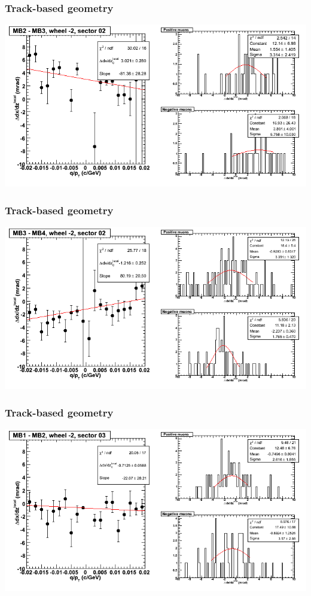 \documentclass[compress]{beamer}
\begin{document}
\begin{frame}
\frametitle{Track-based geometry}
\includegraphics[width=\linewidth]{NOV4_segdiffs/dt13_slope_A_02_23.png}
\end{frame}

\begin{frame}
\frametitle{Track-based geometry}
\includegraphics[width=\linewidth]{NOV4_segdiffs/dt13_slope_A_02_34.png}
\end{frame}

\begin{frame}
\frametitle{Track-based geometry}
\includegraphics[width=\linewidth]{NOV4_segdiffs/dt13_slope_A_03_12.png}
\end{frame}
\end{document}
